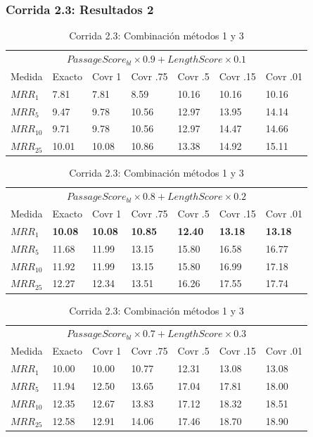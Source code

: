 \begin{frame}
\frametitle{Corrida 2.3: Resultados 2}

\begin{table}
\centering
\begin{center}
\begin{tabular}{|l | l | l | l | l | l | l |}

\multicolumn{7}{|c|}{ $PassageScore_{bl} \times 0.9 + LengthScore \times 0.1$ }  \\ 
Medida & Exacto & Covr 1 & Covr .75 & Covr .5 & Covr .15 & Covr .01 \\ 
$MRR_{1}$ & 7.81 & 7.81 & 8.59 & 10.16 & 10.16 & 10.16  \\ 
$MRR_{5}$ & 9.47 & 9.78 & 10.56 & 12.97 & 13.95 & 14.14  \\ 
$MRR_{10}$ & 9.71 & 9.78 & 10.56 & 12.97 & 14.47 & 14.66  \\ 
$MRR_{25}$ & 10.01 & 10.08 & 10.86 & 13.38 & 14.92 & 15.11  \\ 
\end{tabular}

\medskip

\begin{tabular}{|l | l | l | l | l | l | l |}

\multicolumn{7}{|c|}{ $PassageScore_{bl} \times 0.8 + LengthScore \times 0.2$ }  \\ 
Medida & Exacto & Covr 1 & Covr .75 & Covr .5 & Covr .15 & Covr .01 \\ 
$MRR_{1}$ & \textbf{10.08} & \textbf{10.08} & \textbf{10.85} & \textbf{12.40} & \textbf{13.18} & \textbf{13.18}  \\ 
$MRR_{5}$ & 11.68 & 11.99 & 13.15 & 15.80 & 16.58 & 16.77  \\ 
$MRR_{10}$ & 11.92 & 11.99 & 13.15 & 15.80 & 16.99 & 17.18  \\ 
$MRR_{25}$ & 12.27 & 12.34 & 13.51 & 16.26 & 17.55 & 17.74  \\ 
\end{tabular}

\medskip

\begin{tabular}{|l | l | l | l | l | l | l |}

\multicolumn{7}{|c|}{$PassageScore_{bl} \times 0.7 + LengthScore \times 0.3$}  \\ 
Medida & Exacto & Covr 1 & Covr .75 & Covr .5 & Covr .15 & Covr .01 \\ 
$MRR_{1}$ & 10.00 & 10.00 & 10.77 & 12.31 & 13.08 & 13.08  \\ 
$MRR_{5}$ & 11.94 & 12.50 & 13.65 & 17.04 & 17.81 & 18.00  \\ 
$MRR_{10}$ & 12.35 & 12.67 & 13.83 & 17.12 & 18.32 & 18.51  \\ 
$MRR_{25}$ & 12.58 & 12.91 & 14.06 & 17.46 & 18.70 & 18.90  \\ 
\end{tabular}
\caption{Corrida 2.3: Combinación métodos 1 y 3}

\label{table:2_4_broken_ref}
\end{center}
\end{table}

\end{frame}



